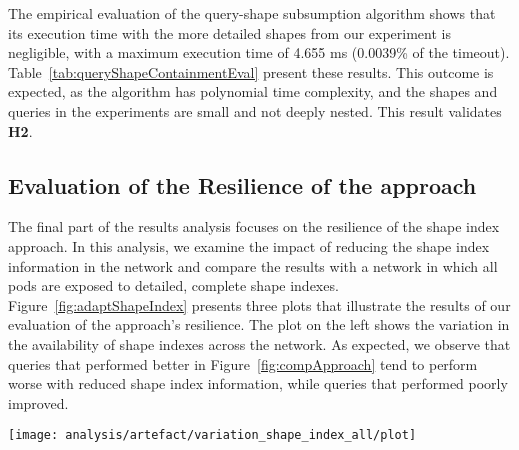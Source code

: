 The empirical evaluation of the query-shape subsumption algorithm shows that its execution time with the more detailed shapes from our experiment is negligible, with a maximum execution time of 4.655 ms (0.0039\% of the timeout).
Table~\ref{tab:queryShapeContainmentEval} present these results.
This outcome is expected, as the algorithm has polynomial time complexity, and the shapes and queries in the experiments are small and not deeply nested.
This result validates \textbf{H2}.


\subsection{Evaluation of the Resilience of the approach}

The final part of the results analysis focuses on the resilience of the shape index approach.
In this analysis, we examine the impact of reducing the shape index information in the network and compare the results with a network in which all pods are exposed to detailed, complete shape indexes.
Figure~\ref{fig:adaptShapeIndex} presents three plots that illustrate the results of our evaluation of the approach's resilience.
The plot on the left shows the variation in the availability of shape indexes across the network. 
As expected, we observe that queries that performed better in Figure~\ref{fig:compApproach} tend to perform worse with reduced shape index information, while queries that performed poorly improved. 


\begin{figure*}
    \centering
    \texttt{[image: analysis/artefact/variation\_shape\_index\_all/plot]}
    \caption{
    Shape index approaches tend to perform less effectively with limited network information and comparatively better where the baseline shape index underperforms.
    A higher ratio indicates a longer query execution time compared to a network with complete shape index information (\textbf{lower is better}).
    }
    \label{fig:adaptShapeIndex}
\end{figure*}


